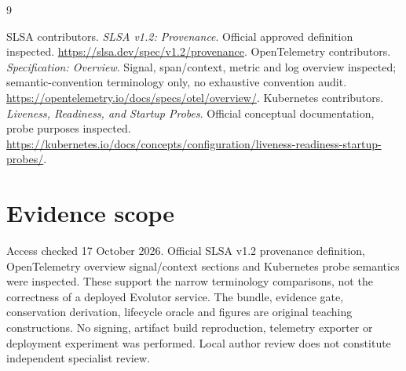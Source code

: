 \begin{thebibliography}{9}
 SLSA contributors. \emph{SLSA v1.2: Provenance}.
Official approved definition inspected.
\url{https://slsa.dev/spec/v1.2/provenance}.
 OpenTelemetry contributors. \emph{Specification: Overview}.
Signal, span/context, metric and log overview inspected; semantic-convention
terminology only, no exhaustive convention audit.
\url{https://opentelemetry.io/docs/specs/otel/overview/}.
 Kubernetes contributors.
\emph{Liveness, Readiness, and Startup Probes}. Official conceptual documentation,
probe purposes inspected.
\url{https://kubernetes.io/docs/concepts/configuration/liveness-readiness-startup-probes/}.
\end{thebibliography}

\section*{Evidence scope}
Access checked 17 October 2026. Official SLSA v1.2 provenance definition,
OpenTelemetry overview signal/context sections and Kubernetes probe semantics
were inspected. These support the narrow terminology comparisons, not the
correctness of a deployed Evolutor service. The bundle, evidence gate,
conservation derivation, lifecycle oracle and figures are original teaching constructions. No signing, artifact build
reproduction, telemetry exporter or deployment experiment was performed.
Local author review does not constitute independent specialist review.
